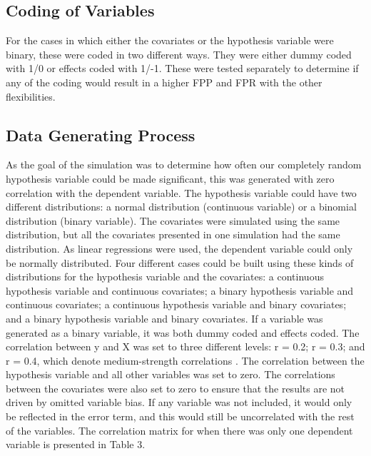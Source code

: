 \subsection{Coding of Variables}
For the cases in which either the covariates or the hypothesis variable were binary, these were coded in two different ways. They were either dummy coded with 1/0 or effects coded with 1/-1. These were tested separately to determine if any of the coding would result in a higher FPP and FPR with the other flexibilities.

\subsection{Data Generating Process}
As the goal of the simulation was to determine how often our completely random hypothesis variable could be made significant, this was generated with zero correlation with the dependent variable. The hypothesis variable could have two different distributions: a normal distribution (continuous variable) or a binomial distribution (binary variable). The covariates were simulated using the same distribution, but all the covariates presented in one simulation had the same distribution. As linear regressions were used, the dependent variable could only be normally distributed. Four different cases could be built using these kinds of distributions for the hypothesis variable and the covariates: a continuous hypothesis variable and continuous covariates; a binary hypothesis variable and continuous covariates; a continuous hypothesis variable and binary covariates; and a binary hypothesis variable and binary covariates. If a variable was generated as a binary variable, it was both dummy coded and effects coded.
The correlation between y and X was set to three different levels: r = 0.2; r = 0.3; and r = 0.4, which denote medium-strength correlations \citep{Cohen1989}. The correlation between the hypothesis variable and all other variables was set to zero. The correlations between the covariates were also set to zero to ensure that the results are not driven by omitted variable bias. If any variable was not included, it would only be reflected in the error term, and this would still be uncorrelated with the rest of the variables. The correlation matrix for when there was only one dependent variable is presented in Table 3. \\

